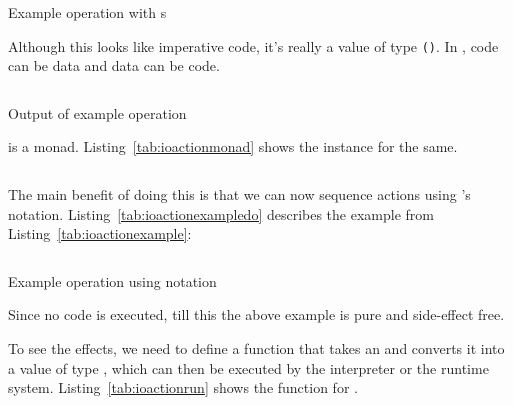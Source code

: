 \documentclass[thesis-solanki.tex]{subfiles}
\begin{document}
\begin{code-list}[H]
\begin{singlespace}
\inputminted{haskell}{haskell-proto4-ioaction-example.hs}
\end{singlespace}
\caption{Example operation with s}
\label{tab:ioactionexample}
\end{code-list}

Although this looks like imperative code, it's really a value of type  \Verb!()!. In ,
code can be data and data can be code.

\begin{code-list}[H]
\begin{singlespace}
\inputminted{haskell}{haskell-proto4-ioaction-example-output.hs}
\end{singlespace}
\caption{Output of example operation}
\label{tab:ioactionexampleoutput}
\end{code-list}

 is a monad. Listing~\ref{tab:ioactionmonad} shows the instance for the same.

\begin{code-list}[H]
\begin{singlespace}
\inputminted{haskell}{haskell-proto4-ioaction-monad.hs}
\end{singlespace}
\caption{}
\label{tab:ioactionmonad}
\end{code-list}



The main benefit of doing this is that we can now sequence actions using 's
 notation. Listing~\ref{tab:ioactionexampledo} describes the example from Listing~\ref{tab:ioactionexample}:

\begin{code-list}[H]
\begin{singlespace}
\inputminted{haskell}{haskell-proto4-ioaction-example-do.hs}
\end{singlespace}
\caption{Example operation using  notation}
\label{tab:ioactionexampledo}
\end{code-list}

Since no code is executed, till this the above example is pure and side-effect free.

To see the effects, we need to define a function that takes an   and converts it into a 
value of type  , which can then be executed by the interpreter or the runtime system. 
Listing~\ref{tab:ioactionrun} shows the  function for .
\end{document}
